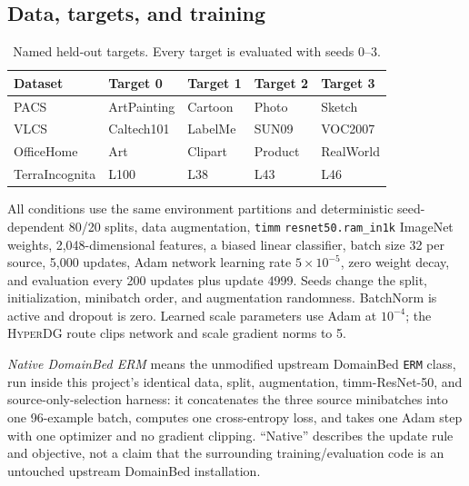 \documentclass[10pt]{article}
\newcommand{\method}{\textsc{HyperDG}}
\begin{document}
\subsection{Data, targets, and training}

\begin{table}[H]
\centering
\caption{Named held-out targets. Every target is evaluated with seeds 0--3.}
\label{tab:target-map}
\small
\begin{tabular}{lllll}
\toprule
Dataset & Target 0 & Target 1 & Target 2 & Target 3 \\
\midrule
PACS & ArtPainting & Cartoon & Photo & Sketch \\
VLCS & Caltech101 & LabelMe & SUN09 & VOC2007 \\
OfficeHome & Art & Clipart & Product & RealWorld \\
TerraIncognita & L100 & L38 & L43 & L46 \\
\bottomrule
\end{tabular}
\end{table}

All conditions use the same environment partitions and
deterministic seed-dependent 80/20 splits, data augmentation,
\texttt{timm} \texttt{resnet50.ram\_in1k} ImageNet weights, 2,048-dimensional
features, a biased linear classifier, batch size 32 per source, 5,000 updates,
Adam network learning rate $5\times10^{-5}$, zero weight decay, and evaluation
every 200 updates plus update 4999. Seeds change the split, initialization,
minibatch order, and augmentation randomness. BatchNorm is active and dropout
is zero. Learned scale parameters use Adam at $10^{-4}$; the \method{} route
clips network and scale gradient norms to 5.

\emph{Native DomainBed ERM} means the unmodified upstream DomainBed
\texttt{ERM} class, run inside this project's identical data, split,
augmentation, timm-ResNet-50, and source-only-selection harness: it
concatenates the three source minibatches into one 96-example batch, computes
one cross-entropy loss, and takes one Adam step with one optimizer and no
gradient clipping. ``Native'' describes the update rule and objective, not a
claim that the surrounding training/evaluation code is an untouched upstream
DomainBed installation.
\end{document}
